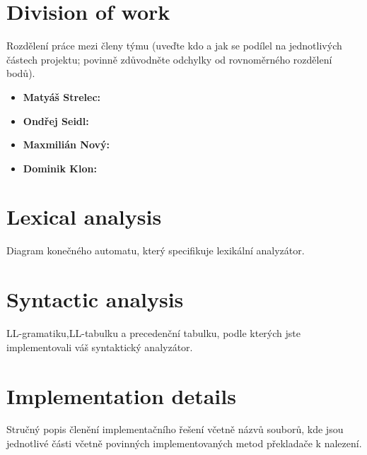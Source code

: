 \documentclass[11pt,a4paper]{article}
\begin{document}
    \section{Division of work}
    Rozdělení práce mezi členy týmu (uveďte kdo a jak se podílel na jednotlivých
    částech projektu; povinně zdůvodněte odchylky od rovnoměrného rozdělení bodů).
    \begin{itemize}
        \item \textbf{Matyáš Strelec:}
        \item \textbf{Ondřej Seidl:}
        \item \textbf{Maxmilián Nový:}
        \item \textbf{Dominik Klon:}
    \end{itemize}

    \section{Lexical analysis}
    Diagram konečného automatu, který specifikuje lexikální analyzátor.

    \section{Syntactic analysis}
    LL-gramatiku,LL-tabulku a precedenční tabulku, podle kterých jste implementovali
    váš syntaktický analyzátor.

    \section{Implementation details}
    Stručný popis členění implementačního řešení včetně názvů souborů, kde jsou jednotlivé
    části včetně povinných implementovaných metod překladače k nalezení.
\end{document}

